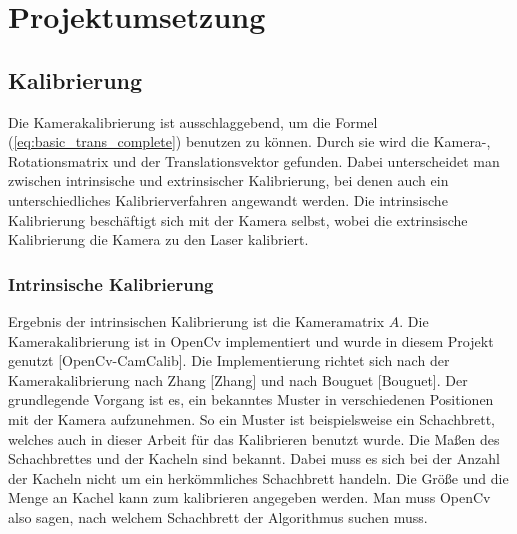 \section{Projektumsetzung}\label{ergebnisse}
	\subsection{Kalibrierung}
		Die Kamerakalibrierung ist ausschlaggebend, um die Formel (\ref{eq:basic_trans_complete}) benutzen zu können. Durch sie wird die Kamera-, Rotationsmatrix und der Translationsvektor gefunden. Dabei unterscheidet man zwischen intrinsische und extrinsischer Kalibrierung, bei denen auch ein unterschiedliches Kalibrierverfahren angewandt werden. Die intrinsische Kalibrierung beschäftigt sich mit der Kamera selbst, wobei die extrinsische Kalibrierung die Kamera zu den Laser kalibriert.
		
		\label{chap:kalibierung}
		\subsubsection{Intrinsische Kalibrierung}
		Ergebnis der intrinsischen Kalibrierung ist die Kameramatrix \( A \). Die Kamerakalibrierung ist in OpenCv implementiert und wurde in diesem Projekt genutzt [OpenCv-CamCalib]. Die Implementierung richtet sich nach der Kamerakalibrierung nach Zhang [Zhang] und nach Bouguet [Bouguet]. \newline
		Der grundlegende Vorgang ist es, ein bekanntes Muster in verschiedenen Positionen mit der Kamera aufzunehmen. So ein Muster ist beispielsweise ein Schachbrett, welches auch in dieser Arbeit für das Kalibrieren benutzt wurde. Die Maßen des Schachbrettes und der Kacheln sind bekannt. Dabei muss es sich bei der Anzahl der Kacheln nicht um ein herkömmliches Schachbrett handeln. Die Größe und die Menge an Kachel kann zum kalibrieren angegeben werden. Man muss OpenCv also sagen, nach welchem Schachbrett der Algorithmus suchen muss.
		
